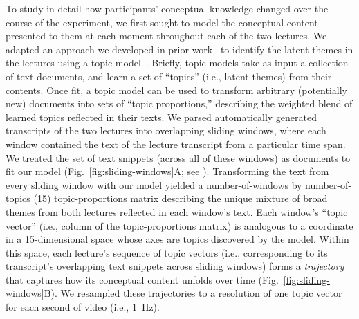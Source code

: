 \documentclass[10pt]{article}
\renewcommand{\nameref}[1]{\mbox{\textit{\oldnameref{#1}}}}
\begin{document}
To study in detail how participants' conceptual knowledge changed over the
course of the experiment, we first sought to model the conceptual content
presented to them at each moment throughout each of the two lectures. We
adapted an approach we developed in prior work~\citep{HeusEtal21} to identify
the latent themes in the lectures using a topic model~\citep{BleiEtal03}.
Briefly, topic models take as input a collection of text documents, and learn a
set of ``topics'' (i.e., latent themes) from their contents. Once fit, a topic
model can be used to transform arbitrary (potentially new) documents into sets
of ``topic proportions,'' describing the weighted blend of learned topics
reflected in their texts. We parsed automatically generated transcripts of the
two lectures into overlapping sliding windows, where each window contained the
text of the lecture transcript from a particular time span. We treated the set
of text snippets (across all of these windows) as documents to fit our model
(Fig.~\ref{fig:sliding-windows}A; see \nameref{subsec:topic-modeling}).
Transforming the text from every sliding window with our model yielded a
number-of-windows by number-of-topics (15) topic-proportions matrix
describing the unique mixture of broad themes from both lectures reflected in
each window's text. Each window's ``topic vector'' (i.e., column of the
topic-proportions matrix) is analogous to a coordinate in a 15-dimensional space whose axes
are topics discovered by the model. Within this space, each lecture's sequence
of topic vectors (i.e., corresponding to its transcript's overlapping text
snippets across sliding windows) forms a \textit{trajectory} that captures how
its conceptual content unfolds over time (Fig.~\ref{fig:sliding-windows}B). We
resampled these trajectories to a resolution of one topic vector for each
second of video (i.e., 1~Hz).
\end{document}
